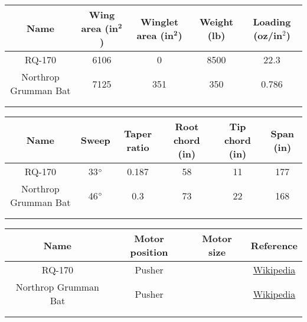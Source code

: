     \begin{table}[H]
        \begin{tabular}{|c|c|c|c|c|} %
            \hline \textbf{Name} & \textbf{Wing area (in$^\textbf{2}$)} & \textbf{Winglet area (in$^\textbf{2}$)} & \textbf{Weight (lb)} & \textbf{Loading (oz/in$^2$)} \\ \hline %
            RQ-170 & 6106 & 0 & 8500 & 22.3 \\ \hline
            Northrop Grumman Bat & 7125 & 351 & 350 & 0.786 \\ \hline
             & & & & \\ \hline
             & & & & \\ \hline
        \end{tabular}
    \end{table}
    
    \begin{table}[H]
        \begin{tabular}{|c|c|c|c|c|c| } %
            \hline \textbf{Name} & \textbf{Sweep} & \textbf{Taper ratio} & \textbf{Root chord (in)} & \textbf{Tip chord (in)} & \textbf{Span (in)} \\ \hline %
            RQ-170 & 33$\degree$ & 0.187 & 58 & 11 & 177 \\ \hline
            Northrop Grumman Bat & 46$ \degree$ & 0.3 & 73 & 22 & 168 \\ \hline
             & & & & & \\ \hline
             & & & & & \\ \hline
        \end{tabular}
    \end{table}
    
    \begin{table}[H]
        \begin{tabular}{|c|c|c|c| } %
            \hline \textbf{Name} & \textbf{Motor position} & \textbf{Motor size} & \textbf{Reference} \\ \hline %
            RQ-170  & Pusher & & \href{https://en.wikipedia.org/wiki/Lockheed_Martin_RQ-170_Sentinel}{Wikipedia}\\ \hline
            Northrop Grumman Bat & Pusher & & \href{https://en.wikipedia.org/wiki/Northrop_Grumman_Bat}{Wikipedia}\\ \hline
             & & & \\ \hline
             & & & \\ \hline
        \end{tabular}
    \end{table}

